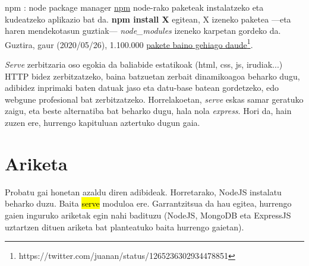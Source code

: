 \begin{alertinfo}{npm : node package manager}
  \href{https://www.npmjs.com/}{npm} node-rako paketeak instalatzeko eta kudeatzeko aplikazio bat da.\textbf{ npm install X} egitean, X izeneko paketea —eta haren mendekotasun guztiak— \textit{node\_modules} izeneko karpetan gordeko da.
  Guztira, gaur (2020/05/26), 1.100.000  \href{https://twitter.com/juanan/status/1265236302934478851}{pakete baino gehiago daude\footnote{https://twitter.com/juanan/status/1265236302934478851}}.
\end{alertinfo}

\textit{Serve} zerbitzaria oso egokia da baliabide estatikoak (html, css, js, irudiak...) HTTP bidez zerbitzatzeko, baina batzuetan zerbait dinamikoagoa beharko dugu, adibidez inprimaki baten datuak jaso eta datu-base batean gordetzeko, edo webgune profesional bat zerbitzatzeko. Horrelakoetan, \textit{serve} eskas samar geratuko zaigu, eta beste alternatiba bat beharko dugu, hala nola \textit{express}. Hori da, hain zuzen ere, hurrengo kapituluan aztertuko dugun gaia.

\section{Ariketa}

Probatu gai honetan azaldu diren adibideak. Horretarako, NodeJS instalatu beharko duzu. Baita \hl{serve} moduloa ere. Garrantzitsua da hau egitea, hurrengo gaien inguruko ariketak egin nahi badituzu (NodeJS, MongoDB eta ExpressJS uztartzen dituen ariketa bat planteatuko baita hurrengo gaietan).